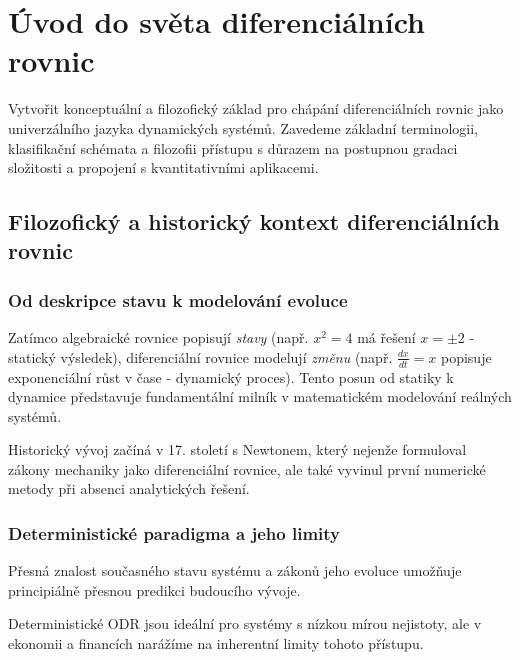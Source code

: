 \section{Úvod do světa diferenciálních rovnic}
\label{sec:uvod-diffeq}

Vytvořit konceptuální a filozofický základ pro chápání diferenciálních rovnic jako univerzálního jazyka dynamických systémů. Zavedeme základní terminologii, klasifikační schémata a filozofii přístupu s důrazem na postupnou gradaci složitosti a propojení s kvantitativními aplikacemi.

\spc

\subsection{Filozofický a historický kontext diferenciálních rovnic}

\subsubsection{Od deskripce stavu k modelování evoluce}

\begin{motivation}
Zatímco algebraické rovnice popisují \emph{stavy} (např. $x^2 = 4$ má řešení $x = \pm 2$ - statický výsledek), diferenciální rovnice modelují \emph{změnu} (např. $\frac{dx}{dt} = x$ popisuje exponenciální růst v čase - dynamický proces). Tento posun od statiky k dynamice představuje fundamentální milník v matematickém modelování reálných systémů.
\end{motivation}

Historický vývoj začíná v 17. století s Newtonem, který nejenže formuloval zákony mechaniky jako diferenciální rovnice, ale také vyvinul první numerické metody při absenci analytických řešení.

\subsubsection{Deterministické paradigma a jeho limity}

\begin{definition}
Přesná znalost současného stavu systému a zákonů jeho evoluce umožňuje principiálně přesnou predikci budoucího vývoje.
\end{definition}

\begin{intuition}
Deterministické ODR jsou ideální pro systémy s nízkou mírou nejistoty, ale v ekonomii a financích narážíme na inherentní limity tohoto přístupu.
\end{intuition}


